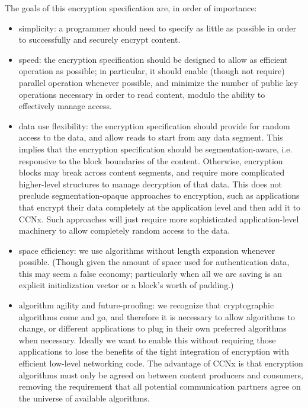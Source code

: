 The goals of this encryption specification are, in order of importance:
\begin{itemize}
\item simplicity: a programmer should need to specify as little as possible in order to successfully and securely encrypt content.
\item speed: the encryption specification should be designed to allow
  as efficient operation as possible; in particular, it should enable
  (though not require) parallel operation whenever possible, and
  minimize the number of public key operations necessary in order to
  read content, modulo the ability to effectively manage access.
\item data use flexibility: the encryption specification should
  provide for random access to the data, and allow reads to start from
  any data segment. This implies that the encryption specification
  should be segmentation-aware, i.e. responsive to the block
  boundaries of the content. Otherwise, encryption blocks may break
  across content segments, and require more complicated higher-level
  structures to manage decryption of that data. This does not preclude
  segmentation-opaque approaches to encryption, such as applications
  that encrypt their data completely at the application level and then
  add it to CCNx. Such approaches will just require more sophisticated
  application-level machinery to allow completely random access to the
  data.
\item space efficiency: we use algorithms without length expansion
  whenever possible. (Though given the amount of space used for
  authentication data, this may seem a false economy; particularly
  when all we are saving is an explicit initialization vector or a
  block's worth of padding.)
\item algorithm agility and future-proofing: we recognize that
  cryptographic algorithms come and go, and therefore it is necessary
  to allow algorithms to change, or different applications to plug in
  their own preferred algorithms when necessary. Ideally we want to
  enable this without requiring those applications to lose the
  benefits of the tight integration of encryption with efficient
  low-level networking code. The advantage of CCNx is that encryption
  algorithms must only be agreed on between content producers and
  consumers, removing the requirement that all potential communication
  partners agree on the universe of available algorithms.
\end{itemize}

